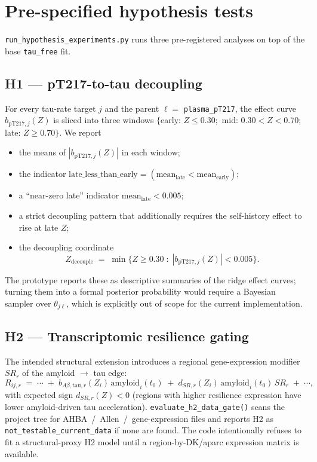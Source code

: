 \documentclass[11pt]{article}
\newcommand{\code}[1]{\texttt{#1}}
\begin{document}
\section{Pre-specified hypothesis tests}

\code{run\_hypothesis\_experiments.py} runs three pre-registered analyses on
top of the base \code{tau\_free} fit.

\subsection{H1 --- pT217-to-tau decoupling}

For every tau-rate target $j$ and the parent $\ell = $ \code{plasma\_pT217},
the effect curve $b_{\text{pT217},j}(Z)$ is sliced into three windows
$\{$early: $Z \leq 0.30$;\, mid: $0.30 < Z < 0.70$;\, late: $Z \geq 0.70\}$.
We report
\begin{itemize}[leftmargin=*,nosep]
  \item the means of $|b_{\text{pT217},j}(Z)|$ in each window;
  \item the indicator $\text{late\_less\_than\_early} = (\text{mean}_{\text{late}} < \text{mean}_{\text{early}})$;
  \item a ``near-zero late'' indicator $\text{mean}_{\text{late}} < 0.005$;
  \item a strict decoupling pattern that additionally requires the self-history effect to rise at late $Z$;
  \item the decoupling coordinate
\begin{equation}
Z_{\text{decouple}} \;=\; \min\bigl\{ Z \geq 0.30 \;:\; |b_{\text{pT217},j}(Z)| < 0.005 \bigr\}.
\label{eq:zdecouple}
\end{equation}
\end{itemize}
The prototype reports these as descriptive summaries of the ridge effect
curves; turning them into a formal posterior probability would require a
Bayesian sampler over $\theta_{j\ell}$, which is explicitly out of scope
for the current implementation.

\subsection{H2 --- Transcriptomic resilience gating}

The intended structural extension introduces a regional gene-expression
modifier $SR_r$ of the amyloid $\to$ tau edge:
\begin{equation}
R_{ij,r} \;=\; \cdots \;+\; b_{A\beta,\text{tau},r}(Z_i)\,\text{amyloid}_i(t_0) \;+\; d_{SR,r}(Z_i)\,\text{amyloid}_i(t_0)\,SR_r \;+\; \cdots,
\label{eq:h2}
\end{equation}
with expected sign $d_{SR,r}(Z) < 0$ (regions with higher resilience
expression have lower amyloid-driven tau acceleration).
\code{evaluate\_h2\_data\_gate()} scans the project tree for
AHBA~/~Allen~/~gene-expression files and reports H2 as
\code{not\_testable\_current\_data} if none are found. The code
intentionally refuses to fit a structural-proxy H2 model until a
region-by-DK/aparc expression matrix is available.
\end{document}
